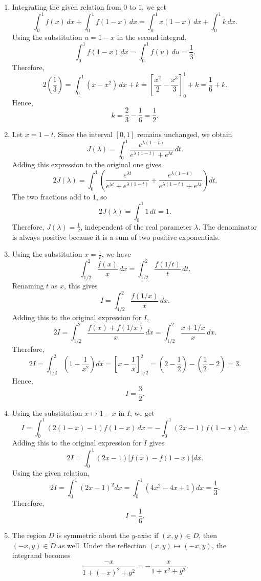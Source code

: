 \documentclass[11pt,a4paper]{article}
\begin{document}
\begin{enumerate}
Since $g(x)>0$, we have $F'(t)=\left(t-\frac12\right)g(t)<0$ for $0<t<\frac12$ and $F'(t)>0$ for $\frac12<t<1$. Therefore, $F$ decreases up to $t=\frac12$ and increases thereafter. Moreover, $F(0)=F(1)=0$, so $F$ has a unique minimum, and thus $|F(t)|$ has a unique maximum, at
\[
\boxed{t=\frac12}.
\]
\item Integrating the given relation from $0$ to $1$, we get
\[
\int_0^1 f(x)\,dx+\int_0^1 f(1-x)\,dx=\int_0^1 x(1-x)\,dx+\int_0^1 k\,dx.
\]
Using the substitution $u=1-x$ in the second integral,
\[
\int_0^1 f(1-x)\,dx=\int_0^1 f(u)\,du=\frac{1}{3}.
\]
Therefore,
\[
2\left(\frac{1}{3}\right)=\int_0^1(x-x^2)\,dx+k
=\left[\frac{x^2}{2}-\frac{x^3}{3}\right]_0^1+k
=\frac{1}{6}+k.
\]
Hence,
\[
k=\frac{2}{3}-\frac{1}{6}=\frac{1}{2}.
\]
\item Let \(x=1-t\). Since the interval \([0,1]\) remains unchanged, we obtain
\[
J(\lambda)=\int_0^1\frac{e^{\lambda(1-t)}}{e^{\lambda(1-t)}+e^{\lambda t}}\,dt.
\]
Adding this expression to the original one gives
\[
2J(\lambda)=\int_0^1\left(\frac{e^{\lambda t}}{e^{\lambda t}+e^{\lambda(1-t)}}+\frac{e^{\lambda(1-t)}}{e^{\lambda(1-t)}+e^{\lambda t}}\right)dt.
\]
The two fractions add to \(1\), so
\[
2J(\lambda)=\int_0^1 1\,dt=1.
\]
Therefore, \(J(\lambda)=\frac12\), independent of the real parameter \(\lambda\). The denominator is always positive because it is a sum of two positive exponentials.
\item Using the substitution $x=\frac1t$, we have
\[
\int_{1/2}^{2}\frac{f(x)}{x}\,dx=\int_{1/2}^{2}\frac{f(1/t)}{t}\,dt.
\]
Renaming $t$ as $x$, this gives
\[
I=\int_{1/2}^{2}\frac{f(1/x)}{x}\,dx.
\]
Adding this to the original expression for $I$,
\[
2I=\int_{1/2}^{2}\frac{f(x)+f(1/x)}{x}\,dx
=\int_{1/2}^{2}\frac{x+1/x}{x}\,dx.
\]
Therefore,
\[
2I=\int_{1/2}^{2}\left(1+\frac1{x^2}\right)dx
=\left[x-\frac1x\right]_{1/2}^{2}
=\left(2-\frac12\right)-\left(\frac12-2\right)=3.
\]
Hence,
\[
I=\frac32.
\]
\item Using the substitution $x\mapsto 1-x$ in $I$, we get
\[
I=\int_0^1(2(1-x)-1)f(1-x)\,dx=-\int_0^1(2x-1)f(1-x)\,dx.
\]
Adding this to the original expression for $I$ gives
\[
2I=\int_0^1(2x-1)\bigl[f(x)-f(1-x)\bigr]dx.
\]
Using the given relation,
\[
2I=\int_0^1(2x-1)^2dx
=\int_0^1(4x^2-4x+1)dx
=\frac{1}{3}.
\]
Therefore,
\[
I=\frac{1}{6}.
\]
\item The region \(D\) is symmetric about the \(y\)-axis: if \((x,y)\in D\), then \((-x,y)\in D\) as well. Under the reflection \((x,y)\mapsto(-x,y)\), the integrand becomes
\[
\frac{-x}{1+(-x)^2+y^2}=-\frac{x}{1+x^2+y^2}.
\]
\end{enumerate}
\end{document}
